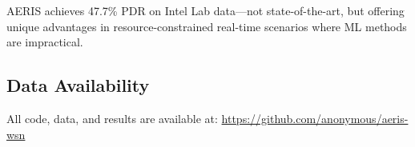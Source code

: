 \documentclass[11pt,a4paper]{article}
\begin{document}
AERIS achieves 47.7\% PDR on Intel Lab data---not state-of-the-art, but offering unique advantages in resource-constrained real-time scenarios where ML methods are impractical.

\subsection*{Data Availability}

All code, data, and results are available at: \url{https://github.com/anonymous/aeris-wsn}



\end{document}
